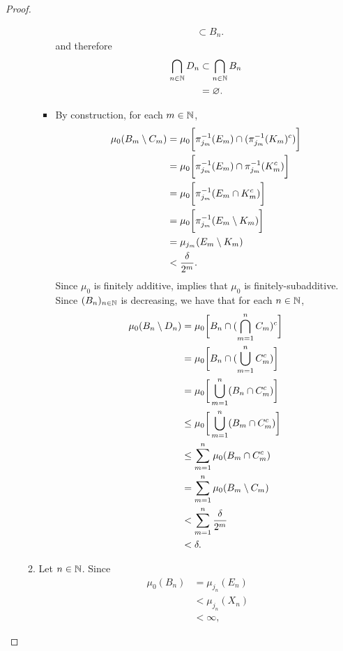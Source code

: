 \documentclass{book}
\begin{document}
\begin{proof}
\begin{enumerate}
\begin{enumerate}
\begin{itemize}
\begin{align*}
					& \subset B_n.
				\end{align*} 
				and therefore 
				\begin{align*}
					\bigcap\limits_{n \in \mathbb{N}} D_n 
					& \subset \bigcap\limits_{n \in \mathbb{N}} B_n \\
					& = \varnothing.
				\end{align*} 
				\item By construction, for each $m \in \mathbb{N}$, 
				\begin{align*}
					\mu_0(B_m \setminus C_m)
					& = \mu_0 \bigg[ \pi_{j_m}^{-1}(E_m) \cap (\pi_{j_m}^{-1}(K_m)^c) \bigg] \\
					& = \mu_0 \bigg[ \pi_{j_m}^{-1}(E_m) \cap \pi_{j_m}^{-1}(K_m^c) \bigg] \\
					& = \mu_0 \bigg[ \pi_{j_m}^{-1}(E_m \cap K_m^c) \bigg] \\
					& = \mu_0 \bigg[ \pi_{j_m}^{-1}(E_m \setminus K_m) \bigg] \\
					& = \mu_{j_m}(E_m \setminus K_m) \\
					& < \frac{\delta}{2^m}.
				\end{align*}
				Since $\mu_0$ is finitely additive,   implies that $\mu_0$ is finitely-subadditive. Since $(B_n)_{n \in \mathbb{N}}$ is decreasing, we have that for each $n \in \mathbb{N}$,
				\begin{align*}
					\mu_0(B_n \setminus D_n)
					& = \mu_0 \bigg[ B_n \cap (\bigcap\limits_{m=1}^n C_m)^c \bigg] \\
					& = \mu_0 \bigg[ B_n \cap (\bigcup\limits_{m=1}^n C_m^c) \bigg] \\
					& = \mu_0 \bigg[\bigcup\limits_{m=1}^n (B_n \cap C_m^c) \bigg] \\
					& \leq \mu_0 \bigg[\bigcup\limits_{m=1}^n (B_m \cap C_m^c) \bigg] \\
					& \leq \sum_{m=1}^n \mu_0(B_m \cap C_m^c) \\
					& = \sum_{m=1}^n \mu_0(B_m \setminus C_m) \\
					& < \sum_{m=1}^n \frac{\delta}{2^m} \\
					& < \delta.
				\end{align*}
			\end{itemize}
			\item Let $n \in \mathbb{N}$. Since 
			\begin{align*}
				\mu_0(B_n)
				& = \mu_{j_n}(E_n) \\
				& < \mu_{j_n}(X_n) \\
				& < \infty, 
			\end{align*}

\end{enumerate}
\end{enumerate}
\end{proof}
\end{document}
